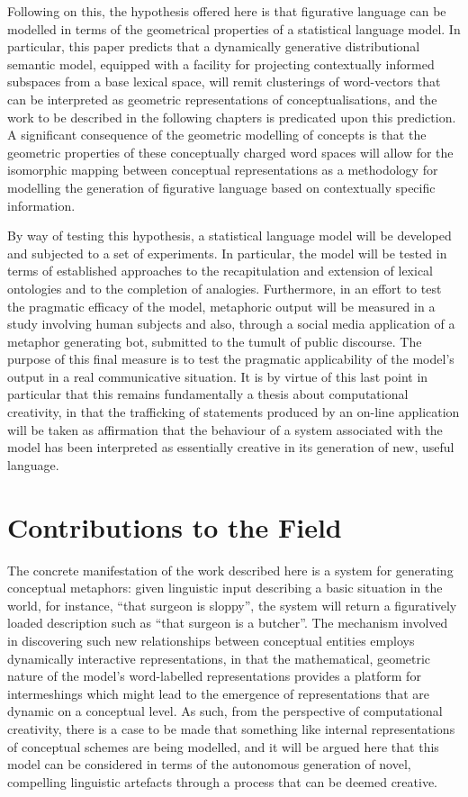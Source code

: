 Following on this, the hypothesis offered here is that figurative language can be modelled in terms of the geometrical properties of a statistical language model.  In particular, this paper predicts that a dynamically generative distributional semantic model, equipped with a facility for projecting contextually informed subspaces from a base lexical space, will remit clusterings of word-vectors that can be interpreted as geometric representations of conceptualisations, and the work to be described in the following chapters is predicated upon this prediction.  A significant consequence of the geometric modelling of concepts is that the geometric properties of these conceptually charged word spaces will allow for the isomorphic mapping between conceptual representations as a methodology for modelling the generation of figurative language based on contextually specific information.

By way of testing this hypothesis, a statistical language model will be developed and subjected to a set of experiments.  In particular, the model will be tested in terms of established approaches to the recapitulation and extension of lexical ontologies and to the completion of analogies.  Furthermore, in an effort to test the pragmatic efficacy of the model, metaphoric output will be measured in a study involving human subjects and also, through a social media application of a metaphor generating bot, submitted to the tumult of public discourse.  The purpose of this final measure is to test the pragmatic applicability of the model's output in a real communicative situation.  It is by virtue of this last point in particular that this remains fundamentally a thesis about computational creativity, in that the trafficking of statements produced by an on-line application will be taken as affirmation that the behaviour of a system associated with the model has been interpreted as essentially creative in its generation of new, useful language.

\section{Contributions to the Field}
The concrete manifestation of the work described here is a system for generating conceptual metaphors: given linguistic input describing a basic situation in the world, for instance, ``that surgeon is sloppy'', the system will return a figuratively loaded description such as ``that surgeon is a butcher''.  The mechanism involved in discovering such new relationships between conceptual entities employs dynamically interactive representations, in that the mathematical, geometric nature of the model's word-labelled representations provides a platform for intermeshings which might lead to the emergence of representations that are dynamic on a conceptual level.  As such, from the perspective of computational creativity, there is a case to be made that something like internal representations of conceptual schemes are being modelled, and it will be argued here that this model can be considered in terms of the autonomous generation of novel, compelling linguistic artefacts through a process that can be deemed creative.

